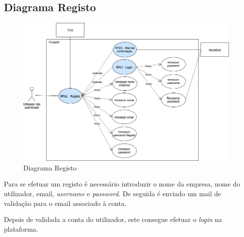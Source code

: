 \newpage

\subsection{Diagrama Registo}
\label{d:registo}
\begin{figure}[ht!]
	\begin{center}
		\includegraphics[width=1\textwidth]{img/rf/registo}
		\caption{Diagrama Registo}
		\label{fig:rf-registo}
	\end{center}
\end{figure}

Para se efetuar um registo é necessário introduzir o nome da empresa, nome do utilizador, email, \textit{username} e \textit{password}. De seguida é enviado um mail de validação para o email associado à conta.

Depois de validada a conta do utilizador, este consegue efetuar o \textit{login} na plataforma.



\newpage


